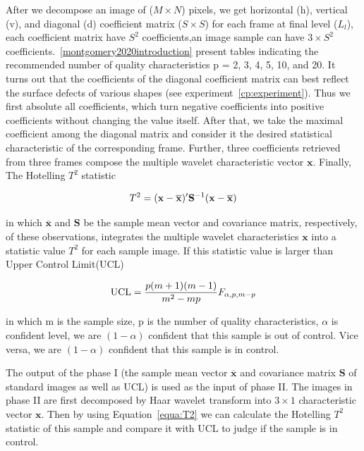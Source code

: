 After we decompose an image of ($M \times N$) pixels, we get horizontal (h), vertical (v), and diagonal (d) coefficient matrix ($S \times S$) for each frame at final level ($L_l$), each coefficient matrix have $S^2$ coefficients,an image sample can have $3 \times S^2$ coefficients.~\ref{montgomery2020introduction} present tables indicating the recommended number of quality characteristics p = 2, 3, 4, 5, 10, and 20. It turns out that the coefficients of the diagonal coefficient matrix can best reflect the surface defects of various shapes (see experiment~\ref{cp:experiment}). Thus we first absolute all coefficients, which turn negative coefficients into positive coefficients without changing the value itself. After that, we take the maximal coefficient among the diagonal matrix and consider it the desired statistical characteristic of the corresponding frame. Further, three coefficients retrieved from three frames compose the multiple wavelet characteristic vector $\mathbf{x}$. Finally, The Hotelling $T^{2}$ statistic

\begin{equation}
\centering T^{2}=(\mathbf{x}-\overline{\mathbf{x}})^{\prime} \mathbf{S}^{-1}(\mathbf{x}-\overline{\mathbf{x}}) \label{equa:T2}
\end{equation}

in which $\overline{\mathbf{x}}$ and $\mathbf{S}$ be the sample mean vector and
covariance matrix, respectively, of these observations,
integrates the multiple wavelet characteristics $\mathbf{x}$ into a statistic value $T^{2}$ for each sample image.
If this statistic value is larger than Upper Control Limit(UCL)

\begin{equation}
\centering \mathrm{UCL}=\frac{p(m+1)(m-1)}{m^{2}-m p} F_{\alpha, p, m-p}
\label{equa:UCL}
\end{equation}

in which m is the sample size, p is the number of quality characteristics, $\alpha$ is confident level,
we are $(1 - \alpha)$ confident that this sample is out of control. Vice versa, we are $(1- \alpha)$ confident that this sample is in control.


The output of the phase I (the sample mean vector $\overline{\mathbf{x}}$ and covariance matrix $\mathbf{S}$ of standard images as well as UCL) is used as the input of phase II. The images in phase II are first decomposed by Haar wavelet transform into $3 \times 1$ characteristic vector $\mathbf{x}$. Then by using Equation~\ref{equa:T2} we can calculate the Hotelling $T^{2}$ statistic of this sample and compare it with UCL to judge if the sample is in control.








